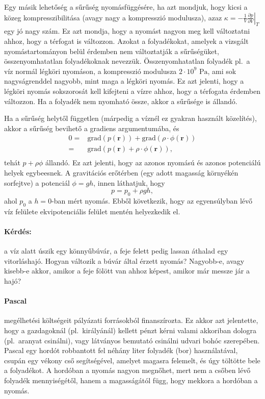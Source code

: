 \documentclass[12pt,a4paper]{scrartcl}
\let\mathbf\bm
\begin{document}
Egy másik lehetőség a sűrűség nyomásfüggésére, ha azt mondjuk, hogy kicsi a közeg kompresszibilitása (avagy nagy a kompresszió modulusza), azaz $\kappa  =  - \frac{1}{V}{\left. {\frac{{\partial p}}{{\partial V}}} \right|_T}$ egy jó nagy szám. Ez azt mondja, hogy a nyomást nagyon meg kell változtatni ahhoz, hogy a térfogat is változzon. Azokat a folyadékokat, amelyek a vizsgált nyomástartományon belül érdemben nem változtatják a sűrűségüket, összenyomhatatlan folyadékoknak nevezzük. Összenyomhatatlan folyadék pl.\ a víz normál légköri nyomáson, a kompresszió modulusza $2 \cdot 10^9\text{ Pa}$, ami sok nagyságrenddel nagyobb, mint maga a légköri nyomás. Ez azt jelenti, hogy a légköri nyomás sokszorosát kell kifejteni a vízre ahhoz, hogy a térfogata érdemben változzon. Ha a folyadék nem nyomható össze, akkor a sűrűsége is állandó.
\normalsize

Ha a sűrűség helytől független (márpedig a víznél ez gyakran használt közelítés), akkor a sűrűség bevihető a gradiens argumentumába, és 
\[\begin{aligned}
  0 =  & {\text{grad}}\left( {p\left( {\mathbf{r}} \right)} \right) +   {\text{grad}}\left( {\rho  \cdot \phi \left( {\mathbf{r}} \right)} \right) \\ 
   =  & {\text{grad}}\left( {p\left( {\mathbf{r}} \right) + \rho  \cdot \phi \left( {\mathbf{r}} \right)} \right), \\ 
\end{aligned} \]
tehát $p+\rho\phi$ állandó. Ez azt jelenti, hogy az azonos nyomású és azonos potenciálú helyek egybeesnek. A gravitációs erőtérben (egy adott magasság környékén sorfejtve) a potenciál $\phi = gh$, innen láthatjuk, hogy
\begin{equation}
p=p_{0}+\rho gh,
\end{equation}
ahol $p_{0}$ a $h=0$-ban mért nyomás. Ebből következik, hogy az egyensúlyban lévő víz felülete ekvipotenciális felület mentén helyezkedik el.
\footnotesize
\paragraph{Kérdés:} a víz alatt úszik egy könnyűbúvár, a feje felett pedig lassan áthalad egy vitorláshajó. Hogyan változik a búvár által érzett nyomás? Nagyobb-e, avagy kisebb-e akkor, amikor a feje fölött van ahhoz képest, amikor már messze jár a hajó?

\paragraph{Pascal} megélhetési költségeit pályázati forrásokból finanszírozta. Ez akkor azt jelentette, hogy a gazdagoknál (pl.\ királyánál) kellett pénzt kérni valami akkoriban dologra (pl.\ aranyat csinálni), vagy látványos bemutató csinálni udvari bohóc szerepében. Pascal egy hordót robbantott fel néhány liter folyadék (bor) használatával, csupán egy vékony cső segítségével, amelyet magasra felemelt, és úgy töltötte bele a folyadékot. A hordóban a nyomás nagyon megnőhet, mert nem a csőben lévő folyadék mennyiségétől, hanem a magasságától függ, hogy mekkora a hordóban a nyomás.
\end{document}
